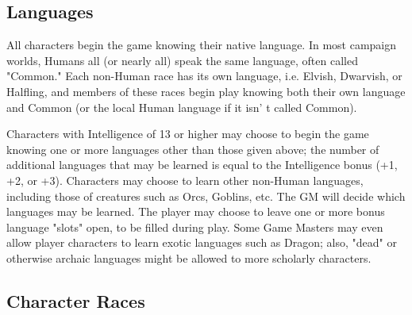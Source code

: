 \documentclass[a4paper,twoside,openany,10pt]{book}
\begin{document}
\begin{multicols}{2}
\subsection{Languages}\label{languages}

All characters begin the game knowing their native language. In most campaign worlds, Humans all (or nearly all) speak the same language, often called "Common." Each non-Human race has its own language, i.e. Elvish, Dwarvish, or Halfling, and members of these races begin play knowing both their own language and Common (or the local Human language if it isn' t called Common).

Characters with Intelligence of 13 or higher may choose to begin the game knowing one or more languages other than those given above; the number of additional languages that may be learned is equal to the Intelligence bonus (+1, +2, or +3). Characters may choose to learn other non-Human languages, including those of creatures such as Orcs, Goblins, etc. The GM will decide which languages may be learned. The player may choose to leave one or more bonus language "slots" open, to be filled during play. Some Game Masters may even allow player characters to learn exotic languages such as Dragon; also, "dead" or otherwise archaic languages might be allowed to more scholarly characters.

\end{multicols}

\pagebreak


\begin{center}
	\subsection{Character Races}
\end{center}\label{character-races}\hypertarget{character-races}{}
\end{document}

